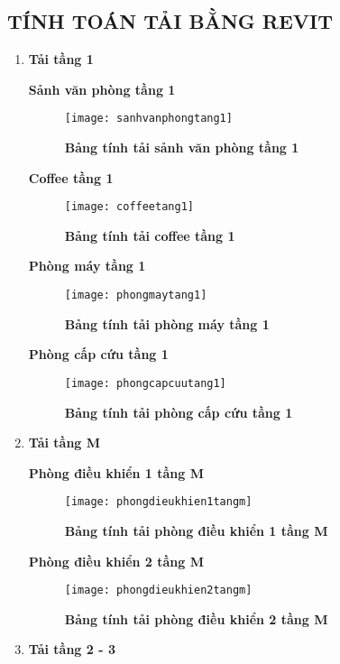 \newpage
\subsection{TÍNH TOÁN TẢI BẰNG REVIT}
\begin{enumerate}
	\item\textbf{Tải tầng 1}
	
\textbf{Sảnh văn phòng tầng 1}
	\begin{figure}[H]
		\centering
		\texttt{[image: sanhvanphongtang1]}
		\caption{\textbf{Bảng tính tải sảnh văn phòng tầng 1}}
		\label{sanvanphongtang1}
	\end{figure}

\textbf{Coffee tầng 1}
\begin{figure}[H]
	\centering
	\texttt{[image: coffeetang1]}
	\caption{\textbf{Bảng tính tải coffee tầng 1}}
	\label{coffeetang1}
\end{figure}

\newpage
\textbf{Phòng máy tầng 1 }
\begin{figure}[H]
	\centering
	\texttt{[image: phongmaytang1]}
	\caption{\textbf{Bảng tính tải phòng máy tầng 1}}
	\label{phongmaytang1}
\end{figure}

\textbf{Phòng cấp cứu tầng 1 }
\begin{figure}[H]
	\centering
	\texttt{[image: phongcapcuutang1]}
	\caption{\textbf{Bảng tính tải phòng cấp cứu tầng 1}}
	\label{caocuutang1}
\end{figure}

\newpage
\item{\textbf{Tải tầng M}}

\textbf{Phòng điều khiển 1 tầng M }
\begin{figure}[H]
	\centering
	\texttt{[image: phongdieukhien1tangm]}
	\caption{\textbf{Bảng tính tải phòng điều khiển 1 tầng M}}
	\label{phongdieukhien1}
\end{figure}

\textbf{Phòng điều khiển 2 tầng M }
\begin{figure}[H]
	\centering
	\texttt{[image: phongdieukhien2tangm]}
	\caption{\textbf{Bảng tính tải phòng điều khiển 2 tầng M}}
	\label{phongdieukhien2}
\end{figure}

\newpage
\item{\textbf{Tải tầng 2 - 3}}


\end{enumerate}
